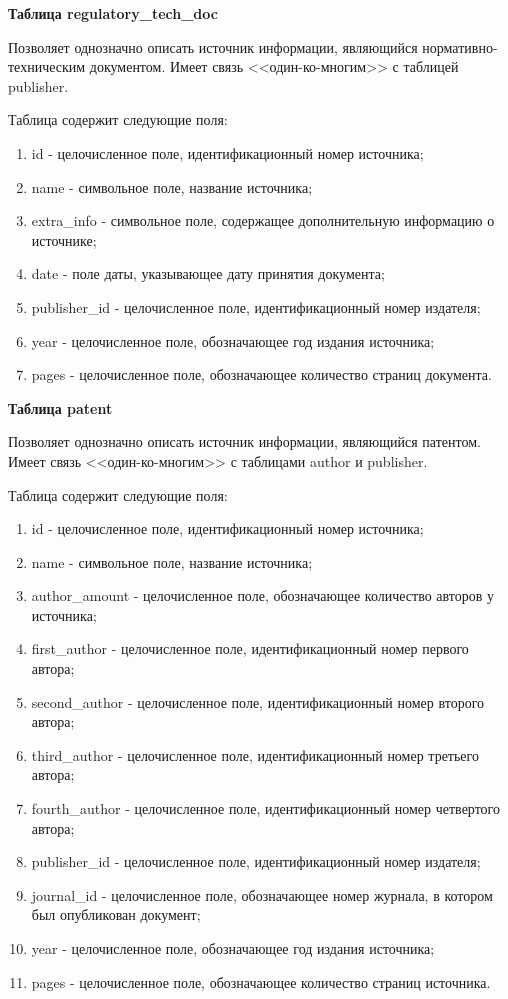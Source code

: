 \hfill \break

{\bf Таблица regulatory\_tech\_doc}

Позволяет однозначно описать источник информации, являющийся нормативно-техническим документом. Имеет связь <<один-ко-многим>> с таблицей publisher. 


Таблица содержит следующие поля:
\begin{enumerate}
	\item id - целочисленное поле, идентификационный номер источника;
	\item name - символьное поле, название источника;
	\item extra\_info - символьное поле, содержащее дополнительную информацию о источнике;
	\item date - поле даты, указывающее дату принятия документа;
	\item publisher\_id - целочисленное поле, идентификационный номер издателя;
	\item year - целочисленное поле, обозначающее год издания источника;
	\item pages - целочисленное поле, обозначающее количество страниц документа.
\end{enumerate}

\hfill \break

{\bf Таблица patent}

Позволяет однозначно описать источник информации, являющийся патентом. Имеет связь <<один-ко-многим>> с таблицами author и publisher. 


Таблица содержит следующие поля:
\begin{enumerate}
	\item id - целочисленное поле, идентификационный номер источника;
	\item name - символьное поле, название источника;
	\item author\_amount - целочисленное поле, обозначающее количество авторов у источника;
	\item first\_author - целочисленное поле, идентификационный номер первого автора;
	\item second\_author - целочисленное поле, идентификационный номер второго автора;
	\item third\_author - целочисленное поле, идентификационный номер третьего автора;
	\item fourth\_author - целочисленное поле, идентификационный номер четвертого автора;
	\item publisher\_id - целочисленное поле, идентификационный номер издателя;
	\item journal\_id - целочисленное поле, обозначающее номер журнала, в котором был опубликован документ;
	\item year - целочисленное поле, обозначающее год издания источника;
	\item pages - целочисленное поле, обозначающее количество страниц источника.
\end{enumerate}
\hfill \break

